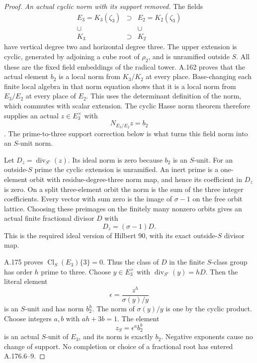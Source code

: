 \begin{proof}
\emph{An actual cyclic norm with its support removed.}
The fields
\[
 \begin{matrix}
 E_3=K_3(\zeta_3)&\supset&E_2=K_2(\zeta_3)\\
 \cup&&\cup\\
 K_3&\supset&K_2
 \end{matrix}
\tag{A.176.5}
\]
have vertical degree two and horizontal degree three.
The upper extension is cyclic, generated by adjoining a cube root
of \(\rho_2\), and is unramified outside \(S\).
All these are the fixed field embeddings of the radical tower.
A.162 proves that the actual element \(b_2\) is a local norm
from \(K_3/K_2\) at every place.
Base-changing each finite local algebra in that norm equation
shows that it is a local norm from \(E_3/E_2\) at every place
of \(E_2\).  This uses the determinant definition of the norm,
which commutes with scalar extension.
The cyclic Hasse norm theorem therefore supplies an actual
\(z\in E_3^\times\) with
\[
                         N_{E_3/E_2}z=b_2
\tag{A.176.6}
\]
\cite[Chapter VIII, Theorem 3.1, printed p.~234]{MilneCFT}.
The prime-to-three support correction below is what turns this
field norm into an \(S\)-unit norm.

Let \(D_z=\operatorname{div}_{S^c}(z)\).
Its ideal norm is zero because \(b_2\) is an \(S\)-unit.
For an outside-\(S\) prime the cyclic extension is unramified.
An inert prime is a one-element orbit with residue-degree-three
norm map, and hence its coefficient in \(D_z\) is zero.
On a split three-element orbit the norm is the sum of the three
integer coefficients.  Every vector with sum zero is the image
of \(\sigma-1\) on the free orbit lattice.
Choosing these preimages on the finitely many nonzero orbits gives
an actual finite fractional divisor \(D\) with
\[
                         D_z=(\sigma-1)D .
\tag{A.176.7}
\]
This is the required ideal version of Hilbert 90, with its exact
outside-\(S\) divisor map.

A.175 proves \(\operatorname{Cl}_{S}(E_3)\{3\}=0\).
Thus the class of \(D\) in the finite \(S\)-class group has order
\(h\) prime to three.  Choose \(y\in E_3^\times\) with
\(\operatorname{div}_{S^c}(y)=hD\).
Then the literal element
\[
              \epsilon=\frac{z^h}{\sigma(y)/y}
\tag{A.176.8}
\]
is an \(S\)-unit and has norm \(b_2^h\).
The norm of \(\sigma(y)/y\) is one by the cyclic product.
Choose integers \(a,b\) with \(ah+3b=1\).
The element
\[
                       z_S=\epsilon^a b_2^b
\tag{A.176.9}
\]
is an actual \(S\)-unit of \(E_3\), and its norm is exactly
\(b_2\).  Negative exponents cause no change of support.
No completion or choice of a fractional root has entered
A.176.6--9.


\end{proof}
